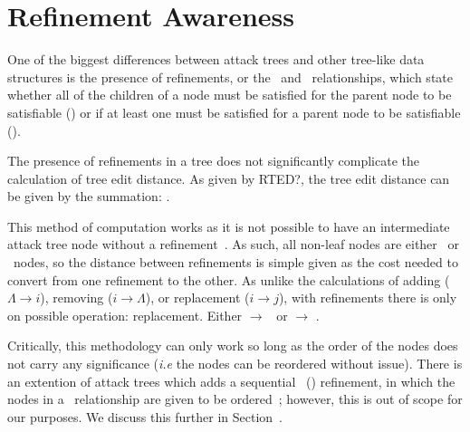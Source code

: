 \section{Refinement Awareness}

One of the biggest differences between attack trees and other tree-like data structures is the presence of refinements, or the \AND\ and \OR\ relationships, which state whether all of the children of a node must be satisfied for the parent node to be satisfiable (\AND) or if at least one must be satisfied for a parent node to be satisfiable (\OR).

The presence of refinements in a tree does not significantly complicate the calculation of tree edit distance. As given by RTED?, the tree edit distance can be given by the summation: .




This method of computation works as it is not possible to have an intermediate attack tree node without a refinement~\cite{mauw_foundations_2006}. As such, all non-leaf nodes are either \AND\ or \OR\ nodes, so the distance between refinements is simple given as the cost needed to convert from one refinement to the other. As unlike the calculations of adding ($\Lambda \rightarrow i$), removing ($i \rightarrow \Lambda$), or replacement ($i \rightarrow j$), with refinements there is only on possible operation: replacement. Either \AND $\rightarrow$ \OR\ or \OR $\rightarrow$ \AND.

Critically, this methodology can only work so long as the order of the nodes does not carry any significance (\textit{i.e} the nodes can be reordered without issue). There is an extention of attack trees which adds a sequential \AND\ (\SAND) refinement, in which the nodes in a \SAND\ relationship are given to be ordered~\cite{jhawar_attack_2015}; however, this is out of scope for our purposes. We discuss this further in Section~.
